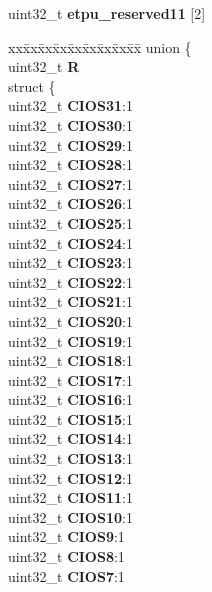 \begin{DoxyCompactItemize}
\begin{tabbing}
\end{tabbing}\item 
\mbox{\label{structETPU__tag_ae3aa15dd2f60a59a2ff0487bf1db6e05}} 
uint32\+\_\+t {\bfseries etpu\+\_\+reserved11} \mbox{[}2\mbox{]}
\item 
\mbox{\label{structETPU__tag_a2eb8d3b549749495ca14e6af2be5057c}} 
\begin{tabbing}
xx\=xx\=xx\=xx\=xx\=xx\=xx\=xx\=xx\=\kill
union \{\\
\>uint32\_t {\bfseries R}\\
\>struct \{\\
\>\>uint32\_t {\bfseries CIOS31}:1\\
\>\>uint32\_t {\bfseries CIOS30}:1\\
\>\>uint32\_t {\bfseries CIOS29}:1\\
\>\>uint32\_t {\bfseries CIOS28}:1\\
\>\>uint32\_t {\bfseries CIOS27}:1\\
\>\>uint32\_t {\bfseries CIOS26}:1\\
\>\>uint32\_t {\bfseries CIOS25}:1\\
\>\>uint32\_t {\bfseries CIOS24}:1\\
\>\>uint32\_t {\bfseries CIOS23}:1\\
\>\>uint32\_t {\bfseries CIOS22}:1\\
\>\>uint32\_t {\bfseries CIOS21}:1\\
\>\>uint32\_t {\bfseries CIOS20}:1\\
\>\>uint32\_t {\bfseries CIOS19}:1\\
\>\>uint32\_t {\bfseries CIOS18}:1\\
\>\>uint32\_t {\bfseries CIOS17}:1\\
\>\>uint32\_t {\bfseries CIOS16}:1\\
\>\>uint32\_t {\bfseries CIOS15}:1\\
\>\>uint32\_t {\bfseries CIOS14}:1\\
\>\>uint32\_t {\bfseries CIOS13}:1\\
\>\>uint32\_t {\bfseries CIOS12}:1\\
\>\>uint32\_t {\bfseries CIOS11}:1\\
\>\>uint32\_t {\bfseries CIOS10}:1\\
\>\>uint32\_t {\bfseries CIOS9}:1\\
\>\>uint32\_t {\bfseries CIOS8}:1\\
\>\>uint32\_t {\bfseries CIOS7}:1\\

\end{tabbing}
\end{DoxyCompactItemize}
